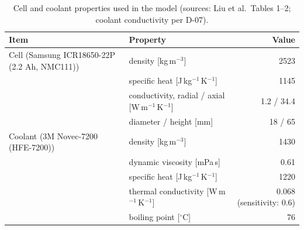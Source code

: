 \begin{table}[h]\centering\caption{Cell and coolant properties used in the model (sources: Liu et al.\ Tables 1--2; coolant conductivity per D-07).}\label{tab:props}
\begin{tabular}{llr}\toprule
Item & Property & Value \\ \midrule
Cell (Samsung ICR18650-22P (2.2 Ah, NMC111)) & density [kg\,m$^{-3}$] & 2523 \\
 & specific heat [J\,kg$^{-1}$\,K$^{-1}$] & 1145 \\
 & conductivity, radial / axial [W\,m$^{-1}$\,K$^{-1}$] & 1.2 / 34.4 \\
 & diameter / height [mm] & 18 / 65 \\
Coolant (3M Novec-7200 (HFE-7200)) & density [kg\,m$^{-3}$] & 1430 \\
 & dynamic viscosity [mPa\,s] & 0.61 \\
 & specific heat [J\,kg$^{-1}$\,K$^{-1}$] & 1220 \\
 & thermal conductivity [W\,m$^{-1}$\,K$^{-1}$] & 0.068 (sensitivity: 0.6) \\
 & boiling point [$^\circ$C] & 76 \\ \bottomrule
\end{tabular}\end{table}
